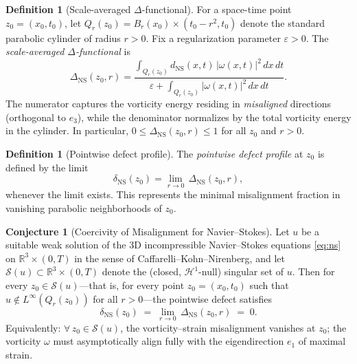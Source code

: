 \documentclass[11pt]{article}
\theoremstyle{definition}
\newtheorem{definition}[theorem]{Definition}
\newtheorem{conjecture}[theorem]{Conjecture}
\theoremstyle{remark}
\newcommand{\R}{\mathbb{R}}
\newcommand{\eps}{\varepsilon}
\begin{document}
\begin{definition}[Scale-averaged $\Delta$-functional]
\label{def:delta-functional}
For a space-time point $z_0 = (x_0, t_0)$, let
$Q_r(z_0) = B_r(x_0) \times (t_0 - r^2, t_0)$ denote the standard
parabolic cylinder of radius $r > 0$.  Fix a regularization parameter
$\eps > 0$.  The \emph{scale-averaged $\Delta$-functional} is
\begin{equation}\label{eq:Delta-NS}
\Delta_{\mathrm{NS}}(z_0, r)
= \frac{\displaystyle\int_{Q_r(z_0)} d_{\mathrm{NS}}(x,t)\,|\omega(x,t)|^2\,dx\,dt}
       {\eps + \displaystyle\int_{Q_r(z_0)} |\omega(x,t)|^2\,dx\,dt}.
\end{equation}
The numerator captures the vorticity energy residing in \emph{misaligned}
directions (orthogonal to $e_3$), while the denominator normalizes by the
total vorticity energy in the cylinder.  In particular,
$0 \leq \Delta_{\mathrm{NS}}(z_0, r) \leq 1$ for all $z_0$ and $r > 0$.
\end{definition}

\begin{definition}[Pointwise defect profile]
\label{def:pointwise-defect}
The \emph{pointwise defect profile} at $z_0$ is defined by the limit
\begin{equation}\label{eq:delta-ns-pointwise}
\delta_{\mathrm{NS}}(z_0)
= \lim_{r \to 0}\, \Delta_{\mathrm{NS}}(z_0, r),
\end{equation}
whenever the limit exists.  This represents the minimal misalignment
fraction in vanishing parabolic neighborhoods of $z_0$.
\end{definition}

\begin{conjecture}[Coercivity of Misalignment for Navier--Stokes]
\label{conj:coercivity}
Let $u$ be a suitable weak solution of the 3D incompressible Navier--Stokes
equations \eqref{eq:ns} on $\R^3 \times (0,T)$ in the sense of
Caffarelli--Kohn--Nirenberg, and let $\mathcal{S}(u) \subset \R^3 \times (0,T)$
denote the (closed, $\mathcal{H}^1$-null) singular set of $u$.
Then for every $z_0 \in \mathcal{S}(u)$---that is, for every point
$z_0 = (x_0, t_0)$ such that $u \notin L^\infty(Q_r(z_0))$ for all $r > 0$---the
pointwise defect satisfies
\begin{equation}\label{eq:coercivity}
\delta_{\mathrm{NS}}(z_0) \;=\; \lim_{r \to 0}\, \Delta_{\mathrm{NS}}(z_0, r) \;=\; 0.
\end{equation}
Equivalently: $\forall\, z_0 \in \mathcal{S}(u)$, the vorticity--strain
misalignment vanishes at $z_0$; the vorticity $\omega$ must asymptotically
align fully with the eigendirection $e_1$ of maximal strain.
\end{conjecture}
\end{document}
